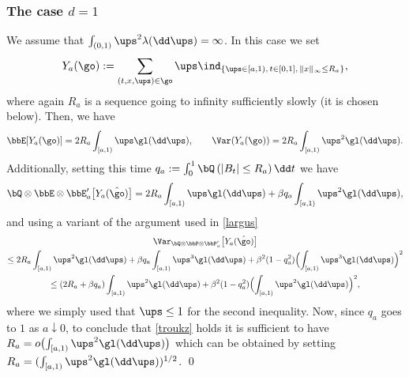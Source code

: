 \subsubsection{The case $d= 1$}
We assume that $\int_{(0,1)} \ups^2 \lambda(\dd \ups) =\infty$.
In this case we set
\begin{equation}
Y_a(\go):= \sum_{(t,x,\ups)\in \go} \ups \ind_{\{ \ups \in [a,1),\, t\in[0,1],\, \|x\|_{\infty} \le R_a\}},
\end{equation}
where again $R_a$ is a sequence going to infinity sufficiently slowly (it is chosen below).
Then, we have
\begin{equation}
\label{fm1}
\bbE[Y_a(\go)]= 2R_a \int_{[a,1)} \ups \gl(\dd \ups), \qquad \Var(Y_a(\go))=2R_a \int_{[a,1)} \ups^2 \gl(\dd \ups).
\end{equation}
Additionally,
setting this time $q_a:=\int^1_0\bQ\left(|B_t|\leq R_a \right) \dd t$ we have
\begin{equation}
\label{fm2}
\bQ\otimes \bbE\otimes \bbE'_a \bigl[ Y_a(\hat\go) \big ]=2R_a \int_{[a,1)} \ups \gl(\dd \ups)+\beta q_a \int_{[a,1)} \ups^2 \gl(\dd \ups),
\end{equation}
and using a variant of the argument used in \eqref{largus}\vspace*{-5pt}
\begin{multline}\label{fm3}
\Var_{\bQ\otimes \bbP\otimes \bbP'_a} \bigl[ Y_a(\hat\go)\big ]\\
\le 2R_a \int_{[a,1)} \ups^2 \gl(\dd \ups)+\beta q_a \int_{[a,1)}\ups^3 \gl(\dd \ups)
+ \beta^2(1-q^2_a)\Bigl(\int_{[a,1)} \ups^3 \gl(\dd \ups)\Bigr)^2\\
\le (2R_a+\beta q_a) \int_{[a,1)} \ups^2 \gl(\dd \ups) + \beta^2(1-q^2_a)\Bigl(\int_{[a,1)} \ups^2 \gl(\dd \ups)\Bigr)^2,
\end{multline}
where we simply used that $\ups \leq 1$ for the second inequality.
Now, since $q_a$ goes to $1$ as $a\downarrow 0$, to conclude that \eqref{troukz} holds it is sufficient to have $R_a = o\bigl(\int_{[a,1)} \ups^2 \gl(\dd \ups) \bigr)$ which can be obtained by setting
$R_a = (\int_{[a,1)} \ups^2 \gl(\dd \ups))^{1/2}$.
\qed

